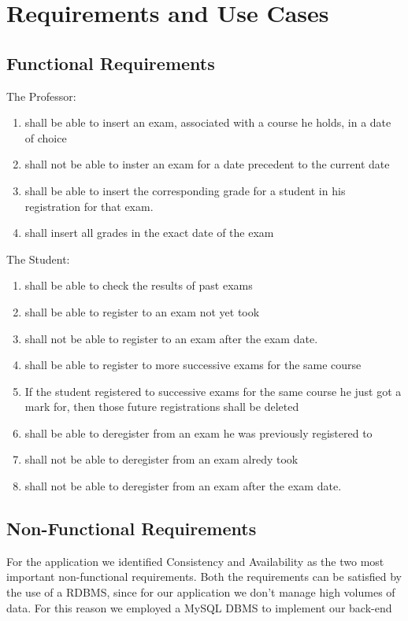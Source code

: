 \documentclass{report}
\begin{document}
\chapter*{Requirements and Use Cases}
\section*{Functional Requirements}
The Professor:
\begin{enumerate}
	\item shall be able to insert an exam, associated with a course he holds, in a date of choice
	\item shall not be able to inster an exam for a date precedent to the current date
	\item shall be able to insert the corresponding grade for a student in his registration for that exam.
	\item shall insert all grades in the exact date of the exam
\end{enumerate}
The Student:
\begin{enumerate}
	\item shall be able to check the results of past exams
	\item shall be able to register to an exam not yet took
	\item shall not be able to register to an exam after the exam date.
	\item shall be able to register to more successive exams for the same course
	\item If the student registered to successive exams for the same course he just got a mark for, then those future registrations shall be deleted
	\item shall be able to deregister from an exam he was previously registered to
	\item shall not be able to deregister from an exam alredy took
	\item shall not be able to deregister from an exam after the exam date.
\end{enumerate}
\section*{Non-Functional Requirements}
For the application we identified Consistency and Availability as the two most important non-functional requirements.
Both the requirements can be satisfied by the use of a RDBMS, since for our application we don't manage high volumes of data. For this reason we employed a MySQL DBMS to implement our back-end
\newpage
{}
\end{document}
